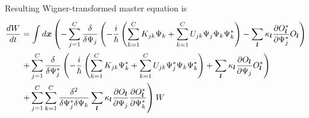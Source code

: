 Resulting Wigner-transformed master equation is
\begin{equation}
\label{eqn:wigner-bec:truncation:fpe}
\begin{split}
	\frac{dW}{dt}
	& = \int d\boldsymbol{x} \left(
		- \sum_{j=1}^C \frac{\delta}{\delta \Psi_j} \left(
			-\frac{i}{\hbar} \left(
				\sum_{k=1}^C K_{jk} \Psi_k
				+ \sum_{k=1}^C U_{jk} \Psi_j \Psi_k \Psi_k^*
			\right)
			- \sum_{\boldsymbol{l}} \kappa_{\boldsymbol{l}} \frac{\partial O_{\boldsymbol{l}}^*}{\partial \Psi_j^*} O_{\boldsymbol{l}}
		\right)
	\right. \\
	& \left.
		+ \sum_{j=1}^C \frac{\delta}{\delta \Psi_j^*} \left(
			-\frac{i}{\hbar} \left(
				\sum_{k=1}^C K_{jk} \Psi_k^*
				+ \sum_{k=1}^C U_{jk} \Psi_j^* \Psi_k \Psi_k^*
			\right)
			+ \sum_{\boldsymbol{l}} \kappa_{\boldsymbol{l}} \frac{\partial O_{\boldsymbol{l}}}{\partial \Psi_j} O_{\boldsymbol{l}}^*
		\right)
	\right. \\
	& \left. + \sum_{j=1}^C \sum_{k=1}^C \frac{\delta^2}{\delta \Psi_j^* \delta \Psi_k}
		\sum_{\boldsymbol{l}} \kappa_{\boldsymbol{l}}
		\frac{\partial O_{\boldsymbol{l}}}{\partial \Psi_j}
		\frac{\partial O_{\boldsymbol{l}}^*}{\partial \Psi_k^*}
	\right) W
\end{split}
\end{equation}

